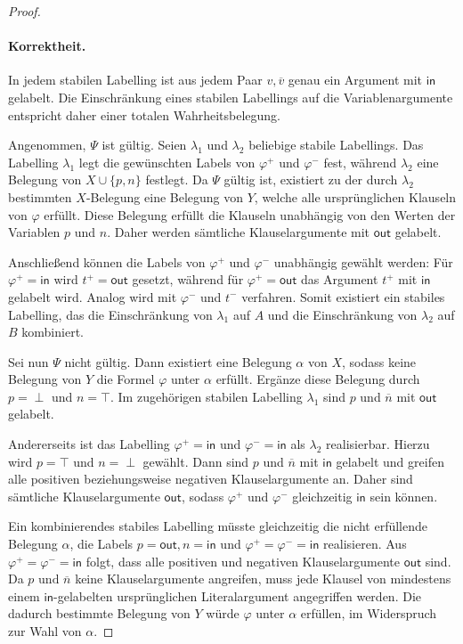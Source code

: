 \begin{proof}
    \paragraph{Korrektheit.}
    In jedem stabilen Labelling ist aus jedem Paar \(v,\overline{v}\) genau ein Argument
    mit \(\mathsf{in}\) gelabelt. Die Einschränkung eines stabilen Labellings auf die
    Variablenargumente entspricht daher einer totalen Wahrheitsbelegung.

    Angenommen, \(\Psi\) ist gültig. Seien \(\lambda_1\) und \(\lambda_2\) beliebige
    stabile Labellings. Das Labelling \(\lambda_1\) legt die gewünschten Labels von
    \(\varphi^{+}\) und \(\varphi^{-}\) fest, während \(\lambda_2\) eine Belegung von
    \(X\cup\{p,n\}\) festlegt. Da \(\Psi\) gültig ist, existiert zu der durch
    \(\lambda_2\) bestimmten \(X\)-Belegung eine Belegung von \(Y\), welche alle
    ursprünglichen Klauseln von \(\varphi\) erfüllt. Diese Belegung erfüllt die
    Klauseln unabhängig von den Werten der Variablen \(p\) und \(n\). Daher werden
    sämtliche Klauselargumente mit \(\mathsf{out}\) gelabelt.

    Anschließend können die Labels von \(\varphi^{+}\) und \(\varphi^{-}\) unabhängig
    gewählt werden: Für \(\varphi^{+}=\mathsf{in}\) wird \(t^{+}=\mathsf{out}\) gesetzt, während für
    \(\varphi^{+}=\mathsf{out}\) das Argument \(t^{+}\) mit \(\mathsf{in}\) gelabelt wird. Analog wird
    mit \(\varphi^{-}\) und \(t^{-}\) verfahren. Somit existiert ein stabiles Labelling,
    das die Einschränkung von \(\lambda_1\) auf \(A\) und die Einschränkung von
    \(\lambda_2\) auf \(B\) kombiniert.

    Sei nun \(\Psi\) nicht gültig. Dann existiert eine Belegung
    \(\alpha\) von \(X\), sodass keine Belegung von \(Y\) die Formel \(\varphi\)
    unter \(\alpha\) erfüllt. Ergänze diese Belegung durch \(p=\perp\) und \(n=\top\).
    Im zugehörigen stabilen Labelling \(\lambda_1\) sind \(p\) und \(\overline{n}\) mit \(\mathsf{out}\)
    gelabelt.

    Andererseits ist das Labelling
    \(\varphi^{+}=\mathsf{in}\) und \(\varphi^{-}=\mathsf{in}\) als \(\lambda_2\) realisierbar. Hierzu wird
    \(p=\top\) und \(n=\perp\) gewählt. Dann sind \(p\) und \(\overline{n}\) mit
    \(\mathsf{in}\) gelabelt und greifen alle positiven beziehungsweise negativen
    Klauselargumente an. Daher sind sämtliche Klauselargumente \(\mathsf{out}\), sodass
    \(\varphi^{+}\) und \(\varphi^{-}\) gleichzeitig \(\mathsf{in}\) sein können.

    Ein kombinierendes stabiles Labelling müsste gleichzeitig die nicht erfüllende
    Belegung \(\alpha\), die Labels \(p=\mathsf{out},n=\mathsf{in}\) und
    \(\varphi^{+}=\varphi^{-}=\mathsf{in}\) realisieren. Aus
    \(\varphi^{+}=\varphi^{-}=\mathsf{in}\) folgt, dass alle positiven und negativen
    Klauselargumente \(\mathsf{out}\) sind. Da \(p\text{ und } \overline{n}\) keine Klauselargumente
    angreifen, muss jede Klausel von mindestens einem \(\mathsf{in}\)-gelabelten ursprünglichen
    Literalargument angegriffen werden. Die dadurch bestimmte Belegung von \(Y\) würde
    \(\varphi\) unter \(\alpha\) erfüllen, im Widerspruch zur Wahl von \(\alpha\).
\end{proof}

